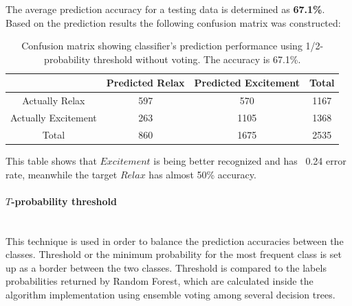 \documentclass[12pt]{article}
\theoremstyle{definition}
\begin{document}
The average prediction accuracy for a testing data is determined as \textbf{67.1\%}. Based on the prediction results the following confusion matrix was constructed:
\begin{table}[H]
 \label{tab:title} 
\begin{center}
  \begin{tabular}{ | c | c | c | c | }
    \hline
     & Predicted Relax & Predicted Excitement & Total \\ \hline
    Actually Relax & 597 & 570 & 1167 \\ \hline
    Actually Excitement & 263 & 1105 & 1368 \\ \hline
    Total & 860 & 1675 & 2535 \\ 
    \hline
  \end{tabular}
\end{center}
\caption{Confusion matrix showing classifier's prediction performance using 1/2-probability threshold without voting. The accuracy is 67.1\%.}
\end{table}

This table shows that $Excitement$ is being better recognized and has ~0.24 error rate, meanwhile the target $Relax$ has almost 50\% accuracy.

\paragraph{$T$-probability threshold}~\\

This technique is used in order to balance the prediction accuracies between the classes. Threshold or the minimum probability for the most frequent class is set up as a border between the two classes. Threshold is compared to the labels probabilities returned by Random Forest, which are calculated inside the algorithm implementation using ensemble voting among several decision trees. 
\end{document}
